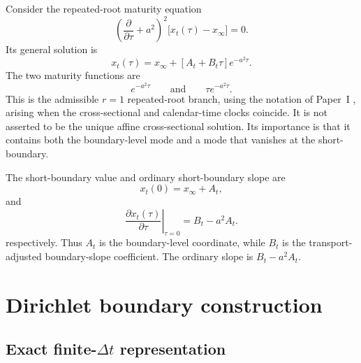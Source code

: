 \documentclass[12pt]{article}
\numberwithin{equation}{subsection}
\begin{document}
Consider the repeated-root maturity equation
\begin{equation}
\left(\frac{\partial}{\partial\tau}+a^2\right)^2
\bigl[x_t(\tau)-x_\infty\bigr]=0.
\end{equation}
Its general solution is
\begin{equation}
\boxed{x_t(\tau)
=
x_\infty+
\left[A_t+B_t\tau\right]e^{-a^2\tau}.}
\end{equation}
The two maturity functions are
\begin{equation}
e^{-a^2\tau}
\qquad\text{and}\qquad
\tau e^{-a^2\tau}.
\end{equation}
This is the admissible $r=1$ repeated-root branch, using the notation of Paper~I \cite{Oza2026}, arising when the cross-sectional and calendar-time clocks coincide. It is not asserted to be the unique affine cross-sectional solution. Its importance is that it contains both the boundary-level mode and a mode that vanishes at the short-boundary.

The short-boundary value and ordinary short-boundary slope are
\begin{equation}
x_t(0)=x_\infty+A_t,
\end{equation}
and
\begin{equation}
\left.\frac{\partial x_t(\tau)}{\partial\tau}\right|_{\tau=0}
=
B_t-a^2A_t.
\end{equation}
respectively. Thus $A_t$ is the boundary-level coordinate, while $B_t$ is the transport-adjusted boundary-slope coefficient. The ordinary slope is $B_t-a^2A_t$.

\section{Dirichlet boundary construction}

\subsection{Exact finite-$\Delta t$ representation}
\end{document}
